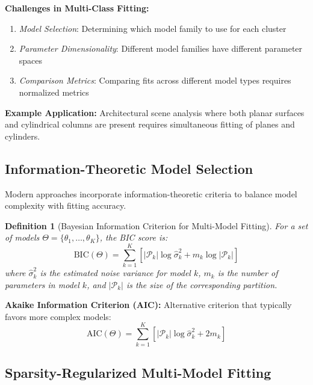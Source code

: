 \documentclass[12pt]{article}
\newtheorem{definition}[theorem]{Definition}
\begin{document}
\textbf{Challenges in Multi-Class Fitting:}
\begin{enumerate}
    \item \textit{Model Selection}: Determining which model family to use for each cluster
    \item \textit{Parameter Dimensionality}: Different model families have different parameter spaces
    \item \textit{Comparison Metrics}: Comparing fits across different model types requires normalized metrics
\end{enumerate}

\textbf{Example Application:} Architectural scene analysis where both planar surfaces and cylindrical columns are present requires simultaneous fitting of planes and cylinders.

\subsection{Information-Theoretic Model Selection}
\label{subsec:information_theoretic}

Modern approaches incorporate information-theoretic criteria to balance model complexity with fitting accuracy.

\begin{definition}[Bayesian Information Criterion for Multi-Model Fitting]
    \label{def:bic_multimodel}
    For a set of models $\Theta = \{\theta_1, \ldots, \theta_K\}$, the BIC score is:
    \begin{equation}
        \text{BIC}(\Theta) = \sum_{k=1}^K \left[ |\mathcal{P}_k| \log \hat{\sigma}_k^2 + m_k \log |\mathcal{P}_k| \right]
        \label{eq:bic_multimodel}
    \end{equation}
    where $\hat{\sigma}_k^2$ is the estimated noise variance for model $k$, $m_k$ is the number of parameters in model $k$, and $|\mathcal{P}_k|$ is the size of the corresponding partition.
\end{definition}

\textbf{Akaike Information Criterion (AIC):} Alternative criterion that typically favors more complex models:
\begin{equation}
    \text{AIC}(\Theta) = \sum_{k=1}^K \left[ |\mathcal{P}_k| \log \hat{\sigma}_k^2 + 2m_k \right]
    \label{eq:aic_multimodel}
\end{equation}

\subsection{Sparsity-Regularized Multi-Model Fitting}
\label{subsec:sparsity_regularized}
\end{document}
